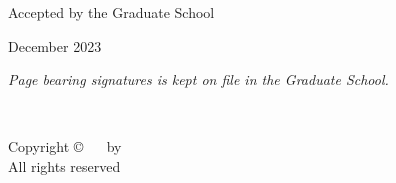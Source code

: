 \documentclass[12pt]{report}
\begin{document}
\vfill

{\hfill
\begin{minipage}{3.625in}
\begin{center}
Accepted by the Graduate School 

December 2023 %


\end{center}
\end{minipage}
}

\vfill

\begin{center}
    {\scriptsize \it Page bearing signatures is kept on file in the Graduate School.}
\end{center}


\pagebreak
\restoregeometry %

\thispagestyle{empty}
~

\vfill{}

\begin{center} 
Copyright \copyright ~ \the\year ~ by \myname \\ %

All rights reserved
\end{center}

\pagebreak
\end{document}
